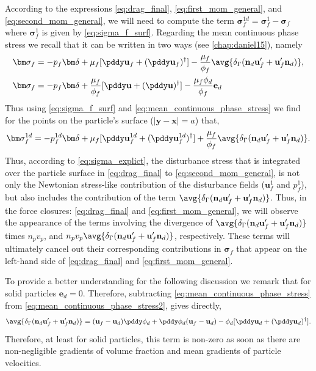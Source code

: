According to the expressions \ref{eq:drag_final}, \ref{eq:first_mom_general}, and \ref{eq:second_mom_general}, we will need to compute the term $\bm\sigma^{1d}_f = \bm\sigma_f^1 - \bm\sigma_f$ where $\bm\sigma_f^1$ is given by \ref{eq:sigma_f_surf}. 
Regarding the mean continuous phase stress we recall that it can be written in two ways (see \ref{chap:daniel15}), namely 
\begin{align}
    \label{eq:mean_continuous_phase_stress}
    \bm\sigma_f
    &= - p_f \bm\delta 
    + \mu_f [\pddy \textbf{u}_f+ (\pddy \textbf{u}_f)^\dagger ]
    - \frac{\mu_f}{\phi_f}\avg{\delta_\Gamma (\textbf{n}_d \textbf{u}_f'+  \textbf{u}_f' \textbf{n}_d)}, \\
    \bm\sigma_f
    &= - p_f \bm\delta 
    + \frac{\mu_f}{\phi_f} [\pddy \textbf{u}+ (\pddy \textbf{u})^\dagger ]
    - \frac{\mu_f \phi_d}{\phi_f} \textbf{e}_d
    \label{eq:mean_continuous_phase_stress2}
\end{align}
Thus using \ref{eq:sigma_f_surf} and \ref{eq:mean_continuous_phase_stress} we find for the points on the particle's surface ($|\textbf{y}-\textbf{x}| = a$) that,
\begin{align}
    \bm\sigma_f^{1d}
    =
    - p_f^{1d} \bm\delta 
    + \mu_f [\pddy \textbf{u}_f^{1d}+ (\pddy \textbf{u}_f^{1d})^\dagger ]
    + \frac{\mu_f }{\phi_f}\avg{\delta_\Gamma (\textbf{n}_d \textbf{u}_f'+  \textbf{u}_f' \textbf{n}_d)}. 
    \label{eq:sigma_explict}
\end{align}
Thus, according to \ref{eq:sigma_explict}, the disturbance stress that is integrated over the particle surface in \ref{eq:drag_final} to \ref{eq:second_mom_general}, is not only the Newtonian stress-like contribution of the disturbance fields ($\textbf{u}_f^1$ and $p_f^1$), but also includes the contribution of the term $\avg{\delta_\Gamma (\textbf{n}_d \textbf{u}_f'+  \textbf{u}_f' \textbf{n}_d)}$. 
Thus, in the force closures: \ref{eq:drag_final} and \ref{eq:first_mom_general}, we will observe the appearance of the terms involving the divergence of $\avg{\delta_\Gamma (\textbf{n}_d \textbf{u}_f'+  \textbf{u}_f' \textbf{n}_d)}$ times $n_pv_p$, and  $n_pv_p \avg{\delta_\Gamma (\textbf{n}_d \textbf{u}_f'+  \textbf{u}_f' \textbf{n}_d)}$, respectively. 
These terms will ultimately cancel out their corresponding contributions in $\bm\sigma_f$ that appear on the left-hand side of \ref{eq:drag_final} and \ref{eq:first_mom_general}. 

To provide a better understanding for the following discussion we remark that for solid particles $\textbf{e}_d = 0$. 
Therefore, subtracting \ref{eq:mean_continuous_phase_stress} from \ref{eq:mean_continuous_phase_stress2}, gives directly, 
\begin{equation}
    \avg{\delta_\Gamma (\textbf{n}_d \textbf{u}_f'+  \textbf{u}_f' \textbf{n}_d)}
    = 
    (\textbf{u}_f - \textbf{u}_d)\pddy \phi_d + \pddy \phi_d (\textbf{u}_f - \textbf{u}_d)
    -  \phi_d [\pddy \textbf{u}_d+ (\pddy \textbf{u}_d)^\dagger ]. 
    \label{eq:closure_un_nu}
\end{equation} 
Therefore, at least for solid particles, this term is non-zero as soon as there are non-negligible gradients of volume fraction and mean gradients of particle velocities. 


